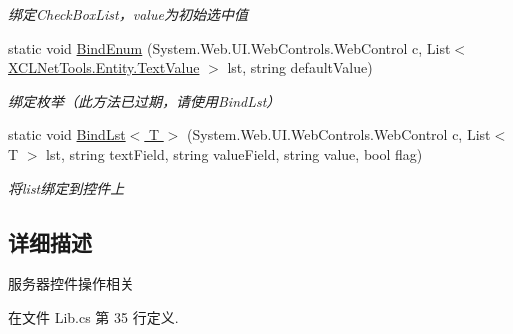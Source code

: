 \begin{DoxyCompactItemize}
\begin{DoxyCompactList}\small\item\em 绑定\-Check\-Box\-List，value为初始选中值 \end{DoxyCompactList}\item 
static void \hyperlink{class_x_c_l_net_tools_1_1_control_1_1_server_control_1_1_lib_acf0e494ba2e94742818fbebfd883ab17}{Bind\-Enum} (System.\-Web.\-U\-I.\-Web\-Controls.\-Web\-Control c, List$<$ \hyperlink{class_x_c_l_net_tools_1_1_entity_1_1_text_value}{X\-C\-L\-Net\-Tools.\-Entity.\-Text\-Value} $>$ lst, string default\-Value)
\begin{DoxyCompactList}\small\item\em 绑定枚举（此方法已过期，请使用\-Bind\-Lst） \end{DoxyCompactList}\item 
static void \hyperlink{class_x_c_l_net_tools_1_1_control_1_1_server_control_1_1_lib_ad5ebfd4eb97120e0049cd0260e150ed9}{Bind\-Lst$<$ T $>$} (System.\-Web.\-U\-I.\-Web\-Controls.\-Web\-Control c, List$<$ T $>$ lst, string text\-Field, string value\-Field, string value, bool flag)
\begin{DoxyCompactList}\small\item\em 将list绑定到控件上 \end{DoxyCompactList}\end{DoxyCompactItemize}


\subsection{详细描述}
服务器控件操作相关 



在文件 Lib.\-cs 第 35 行定义.



